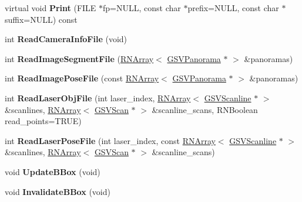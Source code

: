 \begin{DoxyCompactItemize}
\item 
virtual void {\bfseries Print} (F\+I\+LE $\ast$fp=N\+U\+LL, const char $\ast$prefix=N\+U\+LL, const char $\ast$suffix=N\+U\+LL) const \hypertarget{class_g_s_v_run_a3e2f6a084a4e6c34b900bac2425c195b}{}\label{class_g_s_v_run_a3e2f6a084a4e6c34b900bac2425c195b}

\item 
int {\bfseries Read\+Camera\+Info\+File} (void)\hypertarget{class_g_s_v_run_adf13bf89626754a0aab6e2158cf58c2c}{}\label{class_g_s_v_run_adf13bf89626754a0aab6e2158cf58c2c}

\item 
int {\bfseries Read\+Image\+Segment\+File} (\hyperlink{class_r_n_array}{R\+N\+Array}$<$ \hyperlink{class_g_s_v_panorama}{G\+S\+V\+Panorama} $\ast$ $>$ \&panoramas)\hypertarget{class_g_s_v_run_a14fe2cb83f2f3687a7ceccd4b9b2d5c6}{}\label{class_g_s_v_run_a14fe2cb83f2f3687a7ceccd4b9b2d5c6}

\item 
int {\bfseries Read\+Image\+Pose\+File} (const \hyperlink{class_r_n_array}{R\+N\+Array}$<$ \hyperlink{class_g_s_v_panorama}{G\+S\+V\+Panorama} $\ast$ $>$ \&panoramas)\hypertarget{class_g_s_v_run_a3c0e8568503ff0a38dccfcddf6a18034}{}\label{class_g_s_v_run_a3c0e8568503ff0a38dccfcddf6a18034}

\item 
int {\bfseries Read\+Laser\+Obj\+File} (int laser\+\_\+index, \hyperlink{class_r_n_array}{R\+N\+Array}$<$ \hyperlink{class_g_s_v_scanline}{G\+S\+V\+Scanline} $\ast$ $>$ \&scanlines, \hyperlink{class_r_n_array}{R\+N\+Array}$<$ \hyperlink{class_g_s_v_scan}{G\+S\+V\+Scan} $\ast$ $>$ \&scanline\+\_\+scans, R\+N\+Boolean read\+\_\+points=T\+R\+UE)\hypertarget{class_g_s_v_run_a550d862fb439e2a21050e850cb07f1a8}{}\label{class_g_s_v_run_a550d862fb439e2a21050e850cb07f1a8}

\item 
int {\bfseries Read\+Laser\+Pose\+File} (int laser\+\_\+index, const \hyperlink{class_r_n_array}{R\+N\+Array}$<$ \hyperlink{class_g_s_v_scanline}{G\+S\+V\+Scanline} $\ast$ $>$ \&scanlines, \hyperlink{class_r_n_array}{R\+N\+Array}$<$ \hyperlink{class_g_s_v_scan}{G\+S\+V\+Scan} $\ast$ $>$ \&scanline\+\_\+scans)\hypertarget{class_g_s_v_run_a565f1d1f7127836b88bd65508289a3f5}{}\label{class_g_s_v_run_a565f1d1f7127836b88bd65508289a3f5}

\item 
void {\bfseries Update\+B\+Box} (void)\hypertarget{class_g_s_v_run_a8c00765006859f8b37e13d11e49b87a4}{}\label{class_g_s_v_run_a8c00765006859f8b37e13d11e49b87a4}

\item 
void {\bfseries Invalidate\+B\+Box} (void)\hypertarget{class_g_s_v_run_abc989f65a0a7df7681d61f431600157d}{}\label{class_g_s_v_run_abc989f65a0a7df7681d61f431600157d}

\end{DoxyCompactItemize}
